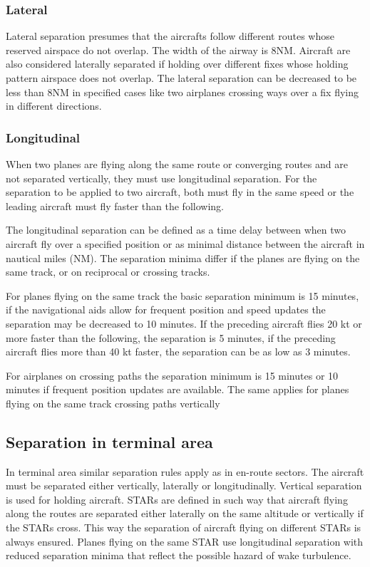 \subsubsection{Lateral}

Lateral separation presumes that the aircrafts follow different routes whose reserved airspace do not overlap. \cite[Chapter 7]{nolan} The width of the airway is 8NM. Aircraft are also considered laterally separated if holding over different fixes whose holding pattern airspace does not overlap. The lateral separation can be decreased to be less than 8NM in specified cases like two airplanes crossing ways over a fix flying in different directions.

\subsubsection{Longitudinal}

When two planes are flying along the same route or converging routes and are not separated vertically, they must use longitudinal separation. For the separation to be applied to two aircraft, both must fly in the same speed or the leading aircraft must fly faster than the following.

The longitudinal separation can be defined as a time delay between when two aircraft fly over a specified position or as minimal distance between the aircraft in nautical miles (NM). The separation minima differ if the planes are flying on the same track, or on reciprocal or crossing tracks.

For planes flying on the same track the basic separation minimum is 15 minutes, if the navigational aids allow for frequent position and speed updates the separation may be decreased to 10 minutes. If the preceding aircraft flies 20 kt or more faster than the following, the separation is 5 minutes, if the preceding aircraft flies more than 40 kt faster, the separation can be as low as 3 minutes. \cite[Chapter 5]{doc4444}

For airplanes on crossing paths the separation minimum is 15 minutes or 10 minutes if frequent position updates are available. The same applies for planes flying on the same track crossing paths vertically

\subsection{Separation in terminal area}

In terminal area similar separation rules apply as in en-route sectors. The aircraft must be separated either vertically, laterally or longitudinally. Vertical separation is used for holding aircraft. STARs are defined in such way that aircraft flying along the routes are separated either laterally on the same altitude or vertically if the STARs cross. This way the separation of aircraft flying on different STARs is always ensured. Planes flying on the same STAR use longitudinal separation with reduced separation minima that reflect the possible hazard of wake turbulence.

